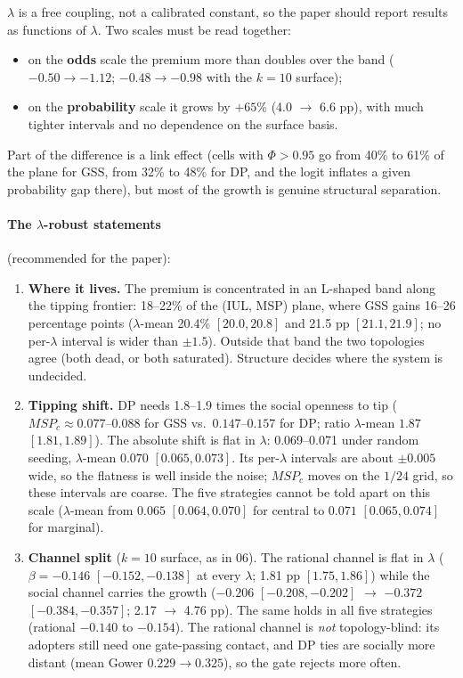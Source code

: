 \documentclass[11pt,a4paper]{article}
\begin{document}
$\lambda$ is a free coupling, not a calibrated constant, so the paper should report
results as functions of $\lambda$. Two scales must be read together:
\begin{itemize}
  \item on the \textbf{odds} scale the premium more than doubles over the band
    ($-0.50 \to -1.12$; $-0.48 \to -0.98$ with the $k = 10$ surface);
  \item on the \textbf{probability} scale it grows by $+65\%$ (4.0 $\to$ 6.6 pp), with
    much tighter intervals and no dependence on the surface basis.
\end{itemize}
Part of the difference is a link effect (cells with $\Phi > 0.95$ go from 40\% to 61\% of
the plane for GSS, from 32\% to 48\% for DP, and the logit inflates a given probability gap
there), but most of the growth is genuine structural separation.

\paragraph{The $\lambda$-robust statements} (recommended for the paper):
\begin{enumerate}
  \item \textbf{Where it lives.} The premium is concentrated in an L-shaped band along
    the tipping frontier: 18--22\% of the (IUL, MSP) plane, where GSS gains 16--26
    percentage points ($\lambda$-mean 20.4\% $[20.0, 20.8]$ and 21.5 pp $[21.1, 21.9]$;
    no per-$\lambda$ interval is wider than $\pm 1.5$). Outside that band the two
    topologies agree (both dead, or both saturated). Structure decides where the system
    is undecided.
  \item \textbf{Tipping shift.} DP needs 1.8--1.9 times the social openness to tip
    ($MSP_c \approx 0.077$--$0.088$ for GSS vs.\ $0.147$--$0.157$ for DP; ratio
    $\lambda$-mean $1.87$ $[1.81, 1.89]$). The absolute shift is flat in $\lambda$:
    0.069--0.071 under random seeding, $\lambda$-mean $0.070$ $[0.065, 0.073]$. Its
    per-$\lambda$ intervals are about $\pm 0.005$ wide, so the flatness is well inside the
    noise; $MSP_c$ moves on the $1/24$ grid, so these intervals are coarse. The five
    strategies cannot be told apart on this scale ($\lambda$-mean from $0.065$
    $[0.064, 0.070]$ for central to $0.071$ $[0.065, 0.074]$ for marginal).
  \item \textbf{Channel split} ($k = 10$ surface, as in 06). The rational channel is flat
    in $\lambda$ ($\beta = -0.146$ $[-0.152, -0.138]$ at every $\lambda$; 1.81 pp
    $[1.75, 1.86]$) while the social channel carries the growth ($-0.206$
    $[-0.208, -0.202]$ $\to$ $-0.372$ $[-0.384, -0.357]$; 2.17 $\to$ 4.76 pp). The same
    holds in all five strategies (rational $-0.140$ to $-0.154$). The rational channel
    is \emph{not} topology-blind: its
    adopters still need one gate-passing contact, and DP ties are socially more distant
    (mean Gower $0.229 \to 0.325$), so the gate rejects more often.
\end{enumerate}
\end{document}
